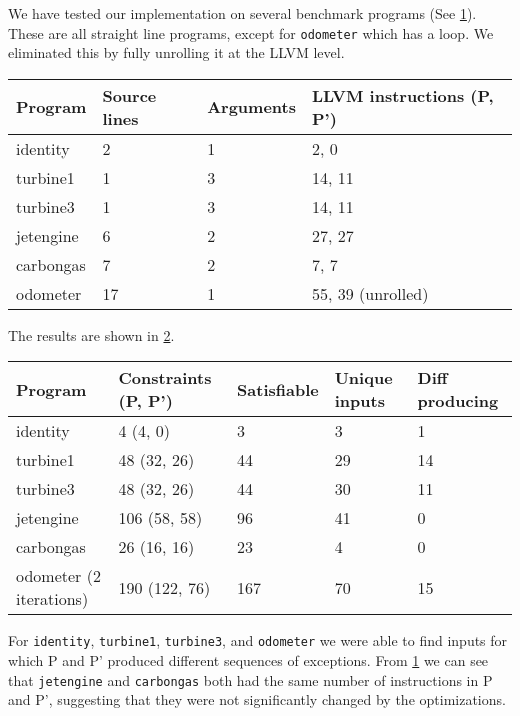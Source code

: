 \documentclass{article}
\begin{document}
We have tested our implementation on several benchmark programs (See
\ref{table:benchmarks}). These are all straight line programs, except for
\texttt{odometer} which has a loop. We eliminated this by fully unrolling it at
the LLVM level.

\begin{table}[h]
\begin{tabular}{l|lll}
Program   & Source lines & Arguments & LLVM instructions (P, P') \\ \hline
identity  & 2            & 1         & 2, 0                      \\
turbine1  & 1            & 3         & 14, 11                    \\
turbine3  & 1            & 3         & 14, 11                    \\
jetengine & 6            & 2         & 27, 27                    \\
carbongas & 7            & 2         & 7, 7                      \\
odometer  & 17           & 1         & 55, 39 (unrolled)
\end{tabular}
\label{table:benchmarks}
\end{table}

The results are shown in \ref{table:results}.

\begin{table}[h]
\begin{tabular}{l|llll}
Program                   & Constraints (P, P') & Satisfiable & Unique inputs & Diff producing \\ \hline
identity                  & 4 (4, 0)            & 3           & 3             &
1              \\
turbine1                  & 48 (32, 26)         & 44          & 29            & 14             \\
turbine3                  & 48 (32, 26)         & 44          & 30            & 11             \\
jetengine                 & 106 (58, 58)        & 96          & 41            & 0              \\
carbongas                 & 26 (16, 16)         & 23          & 4             & 0              \\
odometer (2 iterations)   & 190 (122, 76)       & 167         & 70            &
15
\end{tabular}
\label{table:results}
\end{table}

For \texttt{identity}, \texttt{turbine1}, \texttt{turbine3}, and
\texttt{odometer} we were able to find inputs for which P and P' produced
different sequences of exceptions. From \ref{table:benchmarks} we can see that
\texttt{jetengine} and \texttt{carbongas} both had the same number of
instructions in P and P', suggesting that they were not significantly changed by
the optimizations.
\end{document}
